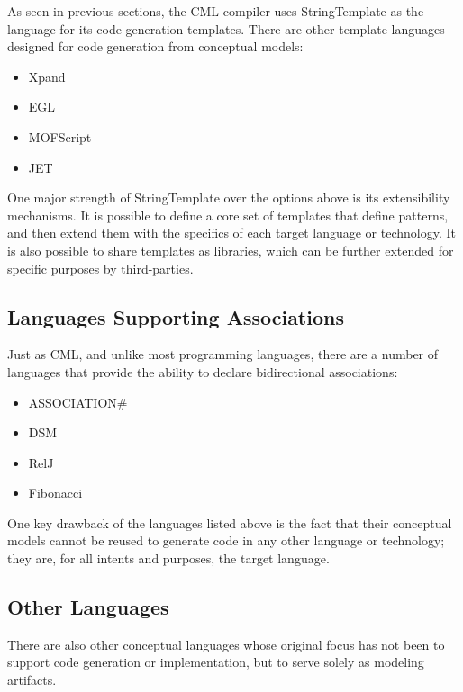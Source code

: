 As seen in previous sections,
the CML compiler uses StringTemplate as the language for its code generation templates.
There are other template languages designed for code generation from conceptual models:

\begin{itemize}
\item Xpand \cite{xpand}
\item EGL \cite{egl}
\item MOFScript \cite{mofscript}
\item JET \cite{jet}
\end{itemize}

One major strength of StringTemplate over the options above is its extensibility mechanisms.
It is possible to define a core set of templates that define patterns, 
and then extend them with the specifics of each target language or technology.
It is also possible to share templates as libraries,
which can be further extended for specific purposes by third-parties.

\subsection{Languages Supporting Associations}

Just as CML,
and unlike most programming languages,
there are a number of languages that provide the ability to declare bidirectional associations:

\begin{itemize}
\item ASSOCIATION\# \cite{cardoso}
\item DSM \cite{balzer}
\item RelJ \cite{bierman}
\item Fibonacci \cite{fibonacci}
\end{itemize}

One key drawback of the languages listed above is the fact that their conceptual models
cannot be reused to generate code in any other language or technology;
they are, for all intents and purposes, the target language.

\subsection{Other Languages}

There are also other conceptual languages whose original focus has not been to support code generation or implementation,
but to serve solely as modeling artifacts.

